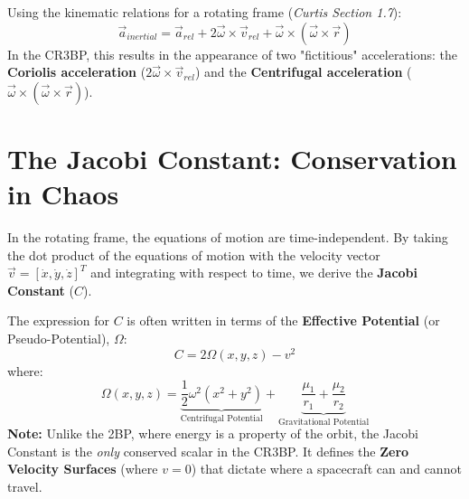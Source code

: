 \documentclass[11pt, a4paper]{article}
\begin{document}
Using the kinematic relations for a rotating frame (\textit{Curtis Section 1.7}):
\begin{equation}
    \vec{a}_{inertial} = \vec{a}_{rel} + 2\vec{\omega} \times \vec{v}_{rel} + \vec{\omega} \times (\vec{\omega} \times \vec{r})
\end{equation}
In the CR3BP, this results in the appearance of two "fictitious" accelerations: the \textbf{Coriolis acceleration} ($2\vec{\omega} \times \vec{v}_{rel}$) and the \textbf{Centrifugal acceleration} ($\vec{\omega} \times (\vec{\omega} \times \vec{r})$).

\section{The Jacobi Constant: Conservation in Chaos}
In the rotating frame, the equations of motion are time-independent. By taking the dot product of the equations of motion with the velocity vector $\vec{v} = [\dot{x}, \dot{y}, \dot{z}]^T$ and integrating with respect to time, we derive the \textbf{Jacobi Constant} ($C$).

The expression for $C$ is often written in terms of the \textbf{Effective Potential} (or Pseudo-Potential), $\Omega$:
\begin{equation}
    C = 2\Omega(x, y, z) - v^2
\end{equation}
where:
\begin{equation}
    \Omega(x, y, z) = \underbrace{\frac{1}{2}\omega^2(x^2 + y^2)}_{\text{Centrifugal Potential}} + \underbrace{\frac{\mu_1}{r_1} + \frac{\mu_2}{r_2}}_{\text{Gravitational Potential}}
\end{equation}
\textbf{Note:} Unlike the 2BP, where energy is a property of the orbit, the Jacobi Constant is the \textit{only} conserved scalar in the CR3BP. It defines the \textbf{Zero Velocity Surfaces} (where $v=0$) that dictate where a spacecraft can and cannot travel.
\end{document}
